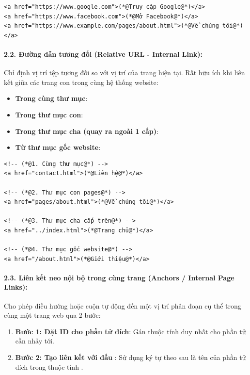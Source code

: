 \begin{codeWindow}
\begin{lstlisting}[language=HTML5]
<a href="https://www.google.com">(*@Truy cập Google@*)</a>
<a href="https://www.facebook.com">(*@Mở Facebook@*)</a>
<a href="https://www.example.com/pages/about.html">(*@Về chúng tôi@*)</a>
\end{lstlisting}
\end{codeWindow}

\paragraph{2.2. Đường dẫn tương đối (Relative URL - Internal Link):}
Chỉ định vị trí tệp tương đối so với vị trí của trang hiện tại. Rất hữu ích khi liên kết giữa các trang con trong cùng hệ thống website:
\begin{itemize}[leftmargin=1.5em, itemsep=2pt, parsep=0pt]
    \item \textbf{Trong cùng thư mục}: 
    \item \textbf{Trong thư mục con}: 
    \item \textbf{Trong thư mục cha (quay ra ngoài 1 cấp)}: 
    \item \textbf{Từ thư mục gốc website}: 
\end{itemize}

\begin{codeWindow}
\begin{lstlisting}[language=HTML5]
<!-- (*@1. Cùng thư mục@*) -->
<a href="contact.html">(*@Liên hệ@*)</a>

<!-- (*@2. Thư mục con pages@*) -->
<a href="pages/about.html">(*@Về chúng tôi@*)</a>

<!-- (*@3. Thư mục cha cấp trên@*) -->
<a href="../index.html">(*@Trang chủ@*)</a>

<!-- (*@4. Thư mục gốc website@*) -->
<a href="/about.html">(*@Giới thiệu@*)</a>
\end{lstlisting}
\end{codeWindow}

\paragraph{2.3. Liên kết neo nội bộ trong cùng trang (Anchors / Internal Page Links):}
Cho phép điều hướng hoặc cuộn tự động đến một vị trí phân đoạn cụ thể trong cùng một trang web qua 2 bước:
\begin{enumerate}[leftmargin=1.5em, itemsep=2pt, parsep=0pt]
    \item \textbf{Bước 1: Đặt ID cho phần tử đích}: Gán thuộc tính  duy nhất cho phần tử cần nhảy tới.
    \item \textbf{Bước 2: Tạo liên kết với dấu \codeinline{\#}}: Sử dụng ký tự \codeinline{\#} theo sau là tên  của phần tử đích trong thuộc tính .
\end{enumerate}


